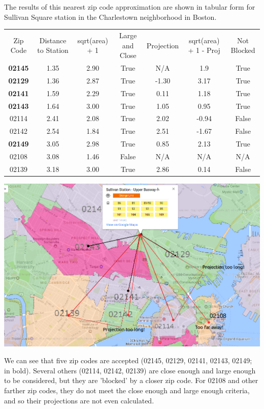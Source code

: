 \documentclass{article}
\begin{document}
The results of this nearest zip code approximation are shown in tabular form for Sullivan Square station in the Charlestown neighborhood in Boston.

\begin{center}
\begin{tabular}{ c c c c c c c }
Zip Code & Distance to Station & sqrt(area) + 1& Large and Close & Projection & sqrt(area) + 1 - Proj & Not Blocked \\
\bf{02145} & 1.35 & 2.90 & True & N/A & 1.9 & True \\
\bf{02129} & 1.36 & 2.87 & True & -1.30 & 3.17 & True \\
\bf{02141} & 1.59 & 2.29 & True & 0.11 & 1.18 & True \\
\bf{02143} & 1.64 & 3.00 & True & 1.05 & 0.95 & True \\
02114 & 2.41 & 2.08 & True & 2.02 & -0.94 & False \\
02142 & 2.54 & 1.84 & True & 2.51 & -1.67 & False \\
\bf{02149} & 3.05 & 2.98 & True & 0.85 & 2.13 & True \\
02108 & 3.08 & 1.46 & False & N/A & N/A & N/A \\ 
02139 & 3.18 & 3.00 & True & 2.86 & 0.14 & False \\
\end{tabular}
\end{center}

\begin{center}\includegraphics[scale=0.6]{Sullivan_for_distance_with_markup}\end{center}

We can see that five zip codes are accepted (02145, 02129, 02141, 02143, 02149; in bold). Several others (02114, 02142, 02139) are close enough and large enough to be considered, but they are 'blocked' by a closer zip code. For 02108 and other farther zip codes, they do not meet the close enough and large enough criteria, and so their projections are not even calculated. 
\end{document}
